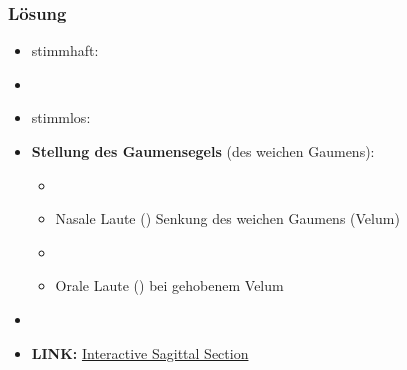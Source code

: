 
\begin{frame}
\frametitle{Lösung}

\begin{itemize}
\item stimmhaft: \textipa{[ d, z, v, g ]}
\item[]
\item stimmlos: \textipa{[ f, k, P ]}
\end{itemize}
\end{frame}


\begin{frame}

	\begin{itemize}
		\item \textbf{Stellung des Gaumensegels} (des weichen Gaumens):
		
		\begin{itemize}
			\item[]
			\item Nasale Laute (\zB \textipa{ [ m , n ]}) \ras Senkung des weichen Gaumens (Velum)
			\item[]
			\item Orale Laute (\zB \textipa{ [ f , a ]}) \ras bei gehobenem Velum
		\end{itemize}
		
		\item[]
		\item \textbf{LINK:} \href{http://smu-facweb.smu.ca/~s0949176/sammy/}{Interactive Sagittal Section}
	\end{itemize}
	
\end{frame}



